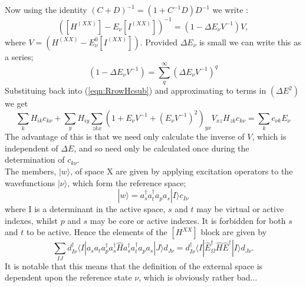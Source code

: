\documentclass[12pt]{article}
\begin{document}
Now using the identity $(C+D)^{-1} = (1+C^{-1}D)D^{-1}$ we write : 
\begin{equation}
([H^{(XX)}]-E_{\nu}[I^{(XX)}])^{-1} =
(1-\Delta E_{\nu}V^{-1})V , 
\end{equation}
\noindent where $V = (H^{(XX)}-E^{0}_{\nu}[I^{(XX)}])$. Provided
 $\Delta E_{\nu}$ is small we can write this as a series;
\begin{equation}
(1-\Delta E_{\nu}V^{-1})= \sum_{q}^{\infty} (\Delta E_{\nu}V^{-1})^{q}
\end{equation}
Substituing back into (\ref{eqn:RrowHcsub}) and approximating to terms in $(\Delta E ^{2})$ we get
\begin{equation}
\sum_{k} H_{ik}c_{k\nu}
+\sum_{y}H_{iy}\sum_{zkx}(1+ E_{\nu}V^{-1}+ (E_{\nu}V^{-1})^{2})_{yx}V_{xz}H_{zk}c_{k\nu}
= \sum_{k}c_{\nu k}E_{\nu}
\label{eqn:RrowHc_series}
\end{equation}
The advantage of this is that we need only calculate the inverse of $V$, which is independent of $\Delta E$, and so
need only be calculated once during the determination of $c_{k \nu}$.\\

\noindent The members, $|w\rangle $, of space X are given by applying excitation operators to the wavefunctions 
$|\nu\rangle$, which form the reference space; 
\begin{equation}
|w\rangle = a_{s}^{\dagger}a_{t}^{\dagger}a_{p}a_{s}|I\rangle c_{I\nu}
\end{equation}
where I is a determinant in the active space, $s$ and $t$ may be virtual
or active indexes, whilst $p$ and $s$ may be core or active indexes. It is forbidden for
both $s$ and $t$ to be active. Hence the elements of the  $[H^{XX}]$ block are given by
\begin{equation}
\sum_{IJ}
d^{\dagger}_{I\nu}\langle I | a_{s}a_{t}a_{p}^{\dagger}a_{s}^{\dagger}
\hat{H}
a_{s}^{\dagger}a_{t}^{\dagger}a_{p}a_{s}|J\rangle d_{J\nu}
=
d^{\dagger}_{I\nu}\langle I |\hat{E}^{\dagger}_{\Omega} 
\hat{H} \hat{E}^{\dagger}|I\rangle d_{J\nu}.
\end{equation}
It is notable that this means that the definition of the external space is dependent upon the 
reference state $\nu$, which is obviously rather bad...
\end{document}
